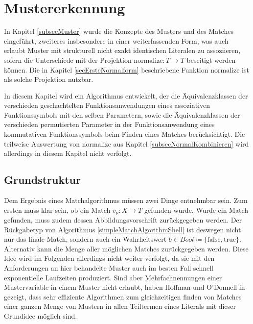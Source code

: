 

\section{Mustererkennung} \label{secPattermatching}

In Kapitel \ref{subsecMuster} wurde die Konzepte des Musters und des Matches eingeführt, zweiteres insbesondere in einer weiterfassenden Form, was auch erlaubt Muster mit strukturell nicht exakt identischen Literalen zu assoziieren, sofern die Unterschiede mit der Projektion $\mathrm{normalize} \colon T \rightarrow T$ beseitigt werden können. Die in Kapitel \ref{secErsteNormalform} beschriebene Funktion $\mathrm{normalize}$ ist als solche Projektion nutzbar.  

In diesem Kapitel wird ein Algorithmus entwickelt, der die Äquivalenzklassen der verschieden geschachtelten Funktionsanwendungen eines assoziativen Funktionssymbols mit den selben Parametern, sowie die Äquivalenzklassen der verschieden permutierten Parameter in der Funktionsanwendung eines kommutativen Funktionssymbols beim Finden eines Matches berücksichtigt. Die teilweise Auswertung von $\mathrm{normalize}$ aus Kapitel \ref{subsecNormalKombinieren} wird allerdings in diesem Kapitel nicht verfolgt.


\subsection{Grundstruktur} \label{subsecPatternmatchingGrundstruktur}

Dem Ergebnis eines Matchalgorithmus müssen zwei Dinge entnehmbar sein. Zum ersten muss klar sein, ob ein Match $v_p \colon X \rightarrow T$ gefunden wurde. Wurde ein Match gefunden, muss zudem dessen Abbildungsvorschrift zurückgegeben werden. Der Rückgabetyp von Algorithmus \ref{simpleMatchAlgorithmShell} ist deswegen nicht nur das finale Match, sondern auch ein Wahrheitswert $b \in \mathit{Bool} \coloneqq \{\mathrm{false}, \mathrm{true}\}$. Alternativ kann die Menge aller möglichen Matches zurückgegeben werden. Diese Idee wird im Folgenden allerdings nicht weiter verfolgt, da sie mit den Anforderungen an hier behandelte Muster auch im besten Fall schnell exponentielle Laufzeiten produziert. Sind aber Mehrfachnennungen einer Mustervariable in einem Muster nicht erlaubt, haben Hoffman und O'Donnell in \cite{patternMatchingInTrees} gezeigt, dass sehr effiziente Algorithmen zum gleichzeitigen finden von Matches einer ganzen Menge von Mustern in allen Teiltermen eines Literals mit dieser Grundidee möglich sind.\\

